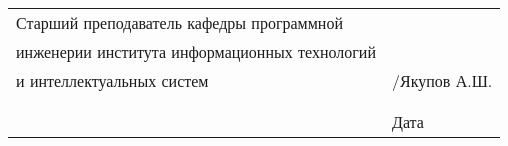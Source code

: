 \documentclass[a4paper,article]{article}
\begin{document}
\begin{sloppypar}
    \begin{xltabular}{\textwidth} {
            >{\hsize} X
            >{\hsize} X }
        Старший преподаватель кафедры программной & \\
        инженерии института информационных технологий  & \\
        и интеллектуальных систем  & \underline{\hspace{3cm}}/Якупов А.Ш. \\
        & \\
        & \\
        & \hfil Дата \underline{\hspace{3cm}} \\
    \end{xltabular}
\end{sloppypar}
\end{document}
